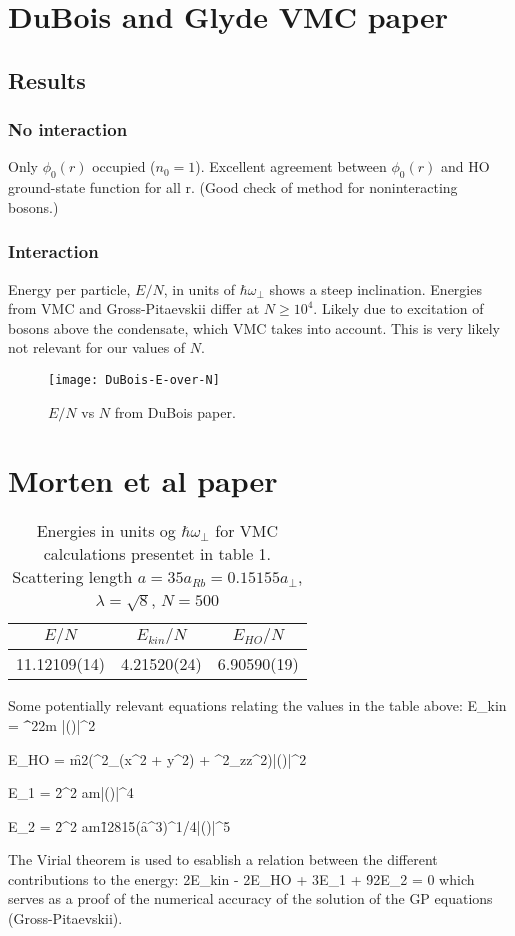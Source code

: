 \section*{DuBois and Glyde VMC paper}
\subsection*{Results}
\subsubsection*{No interaction}
Only $\phi_0(r)$ occupied ($n_0 = 1$). Excellent agreement between $\phi_0(r)$
and HO ground-state function for all r. (Good check of method for noninteracting bosons.)
\subsubsection*{Interaction}
Energy per particle, $E/N$, in units of $\hbar\omega_{\perp}$ shows a steep inclination.
Energies from VMC and Gross-Pitaevskii differ at $N \geq 10^4$. Likely due to excitation of bosons
above the condensate, which VMC takes into account. This is very likely not relevant for our values
of $N$.
\begin{figure}[H]
\texttt{[image: DuBois-E-over-N]}
\caption{$E/N$ vs $N$ from DuBois paper.}
\end{figure}
\section*{Morten et al paper}
\begin{table}[H]
\caption{Energies in units og $\hbar\omega_{\perp}$ for VMC calculations presentet in table 1. 
		Scattering length $a = 35a_{Rb} = 0.15155a_{\perp}$,
		$\lambda = \sqrt{8}$, $N=500$}
	\begin{tabular}{c|c|c}
	$E/N$ & $E_{kin}/N$ & $E_{HO}/N$ \\
	\hline
	11.12109(14) & 4.21520(24) & 6.90590(19) \\
\end{tabular}
\end{table}

Some potentially relevant equations relating the values in the table above:
\beq
E_{kin} = \f{\hbar^2}{2m} \int{}|\nabla\Psi()|^2
\eeq

\beq
E_{HO} = \f{m}{2}\int {}(\omega^{2}_{\perp}(x^2 + y^2) + \omega^{2}_{z}z^2)|\nabla\Psi()|^2
\eeq

\beq
E_1 = \f{2\pi\hbar^2 a}{m}\int {}|\Psi()|^4
\eeq

\beq
E_2 = \f{2\pi\hbar^2 a}{m}\f{128}{15}(\f{a^3}{\pi})^{1/4}\int {}|\Psi()|^5
\eeq

The Virial theorem is used to esablish a relation between the different contributions
to the energy:
\beq
2E_{kin} - 2E_{HO} + 3E_1 + \f{9}{2}E_2 = 0
\eeq
which serves as a proof of the numerical accuracy of the solution of the 
GP equations (Gross-Pitaevskii).



